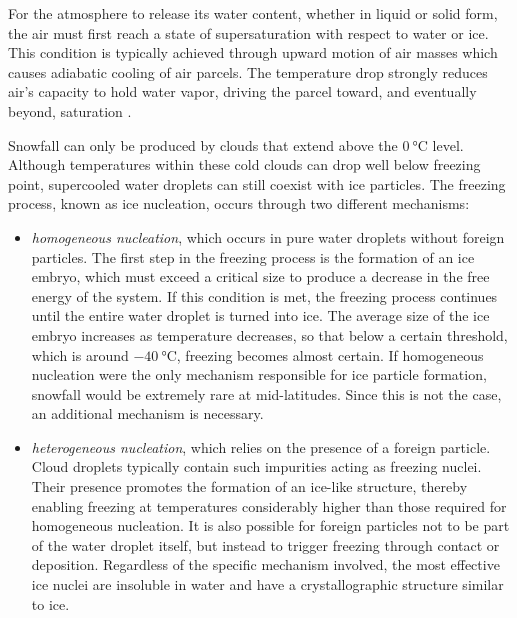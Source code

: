 For the atmosphere to release its water content, whether in liquid or solid form, the air must first reach a state of supersaturation with respect 
to water or ice. This condition is typically achieved through upward motion of air masses which causes adiabatic cooling of air parcels. The 
temperature drop strongly reduces air's capacity to hold water vapor, driving the parcel toward, and eventually beyond, saturation \parencite{libro_ATMO}. 

Snowfall can only be produced by clouds that extend above the $\SI{0}{\degreeCelsius}$ level. Although temperatures within these cold clouds can 
drop well below freezing point, supercooled water droplets can still coexist with ice particles. The freezing process, known as ice nucleation, 
occurs through two different mechanisms:
\begin{itemize}[label=$\blacktriangleright$]
    \item \textit{homogeneous nucleation}, which occurs in pure water droplets without foreign particles. The first step in the freezing process 
    is the formation of an ice embryo, which must exceed a critical size to produce a decrease in the free energy of the system. If this condition is met, 
    the freezing process continues until the entire water droplet is turned into ice. The average size of the ice embryo increases as temperature 
    decreases, so that below a certain threshold, which is around $\SI{-40}{\degreeCelsius}$, freezing becomes almost certain. 
    If homogeneous nucleation were the only mechanism responsible for ice particle formation, snowfall would be extremely rare at mid-latitudes. 
    Since this is not the case, an additional mechanism is necessary. 
    \item \textit{heterogeneous nucleation}, which relies on the presence of a foreign particle. Cloud droplets typically contain such impurities 
    acting as freezing nuclei. Their presence promotes the formation of an ice-like structure, thereby enabling freezing at temperatures considerably 
    higher than those required for homogeneous nucleation. It is also possible for foreign particles not to be part of the water droplet itself, 
    but instead to trigger freezing through contact or deposition. Regardless of the specific mechanism involved, the most effective ice nuclei are 
    insoluble in water and have a crystallographic structure similar to ice.  
\end{itemize}


